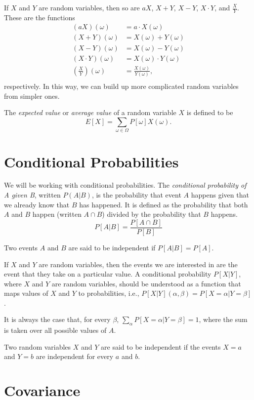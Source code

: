 \documentclass{article}
\theoremstyle{definition}
\begin{document}
If $X$ and $Y$ are random variables, then so are $aX$, $X+Y$, $X-Y$,
$X\cdot Y$, and $\frac{X}{Y}$. These are the functions 
\begin{align*}
(aX)(\omega) &= a \cdot X(\omega)\\
(X+Y)(\omega) &= X(\omega) + Y(\omega)\\
(X-Y)(\omega) &= X(\omega) - Y(\omega)\\
(X\cdot Y)(\omega) &= X(\omega) \cdot Y(\omega)\\
\left(\frac{X}{Y}\right)(\omega) &= \frac{X(\omega)}{Y(\omega)},\\
\end{align*}
respectively. In this way, we can build up more complicated random
variables from simpler ones.

The {\em expected value} or {\em average value} of a random variable
$X$ is defined to be
$$E[X] = \sum_{\omega \in \Omega} P[\omega] X(\omega).$$

\section{Conditional Probabilities}

We will be working with conditional probabilities. The {\em
  conditional probability of A given B}, written $P(A|B)$, is the
probability that event $A$ happens given that we already know that $B$
has happened. It is defined as the probability that both $A$ and $B$
happen (written $A\cap B$) divided by the probability that $B$
happens.
$$P[A|B] = \frac{P[A \cap B]}{P[B]}$$

Two events $A$ and $B$ are said to be independent if $P[A|B] = P[A]$.

If $X$ and $Y$ are random variables, then the events we are interested
in are the event that they take on a particular value. A conditional
probability $P[X|Y]$, where $X$ and $Y$ are random variables, should
be understood as a function that maps values of $X$ and $Y$ to
probabilities, i.e., $P[X|Y](\alpha, \beta) = P[X=\alpha | Y=\beta]$.

It is always the case that, for every $\beta$, $\sum_\alpha
P[X=\alpha|Y=\beta] = 1$, where the sum is taken over all possible
values of $A$.

Two random variables $X$ and $Y$ are said to be independent if the
events $X=a$ and $Y=b$ are independent for every $a$ and $b$.

\section{Covariance}
\end{document}
